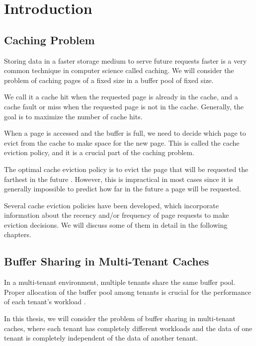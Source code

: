 \chapter{Introduction}

\section{Caching Problem}

Storing data in a faster storage medium to serve future requests faster is a very common technique 
in computer science called caching. We will consider the problem of caching pages of a fixed size 
in a buffer pool of fixed size.

We call it a cache hit when the requested page is already in the cache, and a cache fault or miss 
when the requested page is not in the cache. Generally, the goal is to maximize the number of cache 
hits.

When a page is accessed and the buffer is full, we need to decide which page to evict from the 
cache to make space for the new page. This is called the cache eviction policy, and it is a crucial 
part of the caching problem.

The optimal cache eviction policy is to evict the page that will be requested the farthest in the 
future \cite{lecture-notes-1} \cite{lecture-notes-2} \cite{article-for-belady-ref-1}. However, 
this is impractical in most cases since it is generally impossible to predict how far in the 
future a page will be requested.

Several cache eviction policies have been developed, which incorporate information about the 
recency and/or frequency of page requests to make eviction decisions. We will discuss some of 
them in detail in the following chapters.

\section{Buffer Sharing in Multi-Tenant Caches}

In a multi-tenant environment, multiple tenants share the same buffer pool. Proper allocation of 
the buffer pool among tenants is crucial for the performance of each tenant's workload 
\cite{buffer-sharing-1}.

In this thesis, we will consider the problem of buffer sharing in multi-tenant caches, where each 
tenant has completely different workloads and the data of one tenant is completely independent of 
the data of another tenant.

